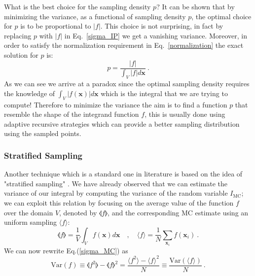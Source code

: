 \documentclass[../main/main.tex]{subfiles}
\begin{document}
What is the best choice for the sampling density $p$?
It can be shown that by minimizing the variance, as a functional of sampling density $p$, the optimal choice for $p$ is to be proportional 
to $|f|$. This choice is not surprising, in fact by replacing $p$ with $|f|$ in Eq.~\ref{sigma_IP} we get a vanishing variance.
Moreover, in order to satisfy the normalization requirement in Eq.~\ref{normalization} the exact solution for $p$ is:
\begin{equation}
	p = \frac{|f|}{\int_V |f| d\textbf{x}} \ .
\end{equation}
\newline
As we can see we arrive at a paradox since the optimal sampling density requires the knowledge of $\int_V |f(\textbf{x})| d\textbf{x}$ which is the integral that we are trying to compute!
\newline
Therefore to minimize the variance the aim is to find a function $p$ that resemble the shape of the integrand function $f$, this is usually done 
using adaptive recursive strategies which can provide a better sampling distribution using the sampled points.
\subsubsection{Stratified Sampling}
Another technique which is a standard one in literature is based on the idea of  "stratified sampling" \cite{Press:1989vk, Press:1992zz}.
We have already observed that we can estimate the variance of our integral by computing the variance of the random variable $I_{\text{MC}}$; we can exploit this relation by focusing on the average value of the function $f$ over the domain $V$, denoted by $\llangle  f \rrangle $, and the corresponding MC estimate using an uniform sampling $ \langle f \rangle$:
\begin{equation}
	\llangle  f \rrangle = \frac{1}{V} \int_V f(\textbf{x}) d\textbf{x} \quad ,  \quad 
	\langle f \rangle = \frac{1}{N} \sum_{\textbf{x}_i} f(\textbf{x}_i) \ .
\end{equation}
We can now rewrite Eq.(\ref{sigma_MC}) as  
\begin{equation}
	\text{Var}( f ) \equiv \llangle f^2 \rrangle - \llangle f \rrangle ^2 = \frac{\langle f^2 \rangle - \langle f \rangle^2}{N} \equiv \frac{\text{Var}(\langle f \rangle )}{N} \ .
\end{equation}
\end{document}
